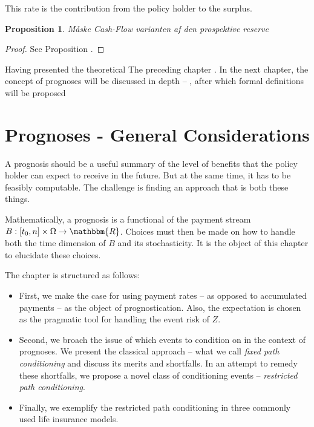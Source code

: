 \documentclass{article}
\newcommand{\1}[1]{\mathbbm{1}_{\left\lbrace #1 \right\rbrace}}
\theoremstyle{break}
\newtheorem{proposition}[definition]{Proposition}%
\theoremstyle{remark}
\numberwithin{equation}{section}
\begin{document}
This rate is the contribution from the policy holder to the surplus.

\begin{proposition}
	Måske Cash-Flow varianten af den prospektive reserve
\end{proposition}

\begin{proof}
	See Proposition \cite{BuchardtMoller}.
\end{proof}

Having presented the theoretical The preceding chapter . In the next chapter, the concept of prognoses will be discussed in depth -- , after which formal definitions will be proposed

\newpage
\section{Prognoses - General Considerations}

A prognosis should be a useful summary of the level of benefits that the policy holder can expect to receive in the future. But at the same time, it has to be  feasibly computable. The challenge is finding an approach that is both these things.

Mathematically, a prognosis is a functional of the payment stream $B: [t_0,n] \times \Omega \to \mathbbm{R}$. Choices must then be made on how to handle both the time dimension of $B$ and its stochasticity. It is the object of this chapter to elucidate these choices.

The chapter is structured as follows:

\begin{itemize}
	\item First, we make the case for using payment rates -- as opposed to accumulated payments -- as the object of prognostication. Also, the expectation is chosen as the pragmatic tool for handling the event risk of $Z$.
	\item Second, we broach the issue of which events to condition on in the context of prognoses. We present the classical approach -- what we call \textit{fixed path conditioning} and discuss its merits and shortfalls. In an attempt to remedy these shortfalls, we propose a novel class of conditioning events -- \textit{restricted path conditioning}.
	\item Finally, we exemplify the restricted path conditioning in three commonly used life insurance models.
\end{itemize}
\end{document}
